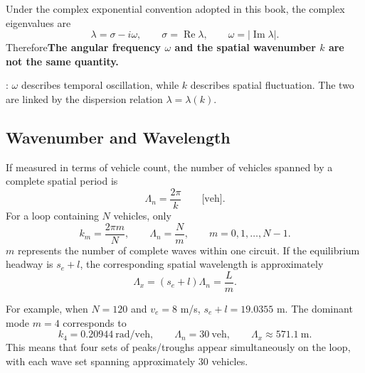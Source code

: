 \documentclass[11pt,a4paper,openany]{book}
\numberwithin{equation}{chapter}
\numberwithin{figure}{chapter}
\numberwithin{table}{chapter}
\begin{document}
Under the complex exponential convention adopted in this book, the complex eigenvalues are
\begin{equation}
\lambda=\sigma-i\omega,
\qquad
\sigma=\operatorname{Re}\lambda,
\qquad
\omega=|\operatorname{Im}\lambda|.
\end{equation}
Therefore\textbf{The angular frequency $\omega$ and the spatial wavenumber $k$ are not the same quantity.}

: $\omega$ describes temporal oscillation, while $k$ describes spatial fluctuation. The two are linked by the dispersion relation $\lambda=\lambda(k)$.

\subsection{Wavenumber and Wavelength}

If measured in terms of vehicle count, the number of vehicles spanned by a complete spatial period is
\begin{equation}
\Lambda_n=\frac{2\pi}{k}
\qquad\text{[veh]}.
\end{equation}
For a loop containing $N$ vehicles, only
\begin{equation}
k_m=\frac{2\pi m}{N},
\qquad
\Lambda_n=\frac{N}{m},
\qquad
m=0,1,\ldots,N-1.
\end{equation}
$m$ represents the number of complete waves within one circuit. If the equilibrium headway is $s_e+l$, the corresponding spatial wavelength is approximately
\begin{equation}
\Lambda_x=(s_e+l)\Lambda_n=\frac{L}{m}.
\end{equation}

For example, when $N=120$ and $v_e=8$ m/s, $s_e+l=19.0355$ m. The dominant mode $m=4$ corresponds to
\begin{equation}
k_4=0.20944\ \text{rad/veh},
\qquad
\Lambda_n=30\ \text{veh},
\qquad
\Lambda_x\approx571.1\ \text{m}.
\end{equation}
This means that four sets of peaks/troughs appear simultaneously on the loop, with each wave set spanning approximately 30 vehicles.
\end{document}
